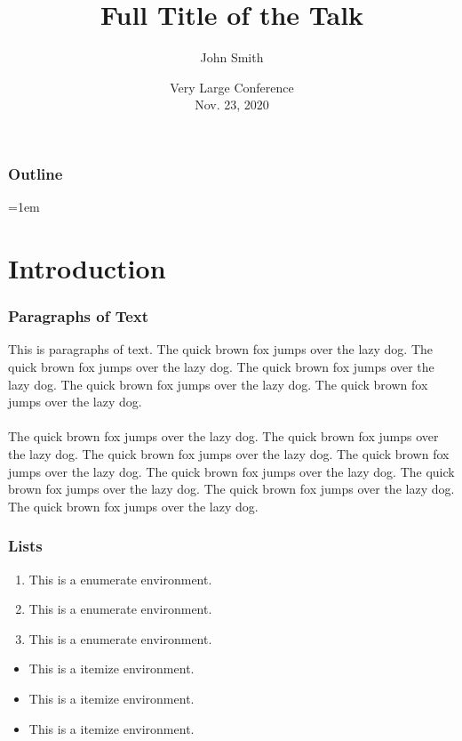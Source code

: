 \documentclass[noamsthm,notheorems,11pt,compress]{beamer}
\title[Short title]{Full Title of the Talk} %
\author{John Smith} %
\institute[NU] %
{\blue{Name of University} \\ %
\medskip
\texttt{xyz@math.univ.edu} %
}
\date[Nov. 23, 2020]{\small Very Large Conference \\[5pt] Nov. 23, 2020} %
\theoremstyle{plain} %
\numberwithin{figure}{section}
\numberwithin{table}{section}
\numberwithin{equation}{section}
\begin{document}
\setlength{\baselineskip}{15pt}

\begin{frame}
\titlepage %
\end{frame}


\begin{frame}
\frametitle{Outline}
\leftskip=1em
\tableofcontents
\end{frame}



\section{Introduction} %

\begin{frame}
\frametitle{Paragraphs of Text}
This is paragraphs of text. The quick brown fox jumps over the lazy dog. The quick brown fox jumps over the lazy dog. The quick brown fox jumps over the lazy dog. The quick brown fox jumps over the lazy dog. The quick brown fox jumps over the lazy dog. \\~\\

The quick brown fox jumps over the lazy dog. The quick brown fox jumps over the lazy dog. The quick brown fox jumps over the lazy dog. The quick brown fox jumps over the lazy dog. The quick brown fox jumps over the lazy dog. The quick brown fox jumps over the lazy dog. The quick brown fox jumps over the lazy dog. The quick brown fox jumps over the lazy dog.
\end{frame}




\begin{frame}
\frametitle{Lists}

\begin{enumerate}
  \item This is a enumerate environment.
  \item This is a enumerate environment.
  \item This is a enumerate environment.
\end{enumerate}

\vspace{2ex}
\begin{itemize}
\item This is a itemize environment.
\item This is a itemize environment.
\item This is a itemize environment.
\end{itemize}
\end{frame}
\end{document}
